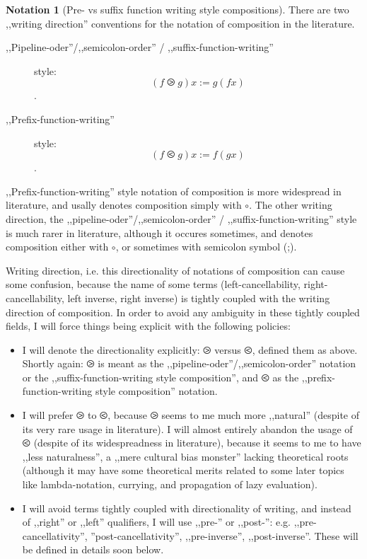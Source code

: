 \documentclass{article}
\newcommand{\parenth}[1]{\left(#1\right)}
\theoremstyle{definition}
\newtheorem{ntn}{Notation}
\begin{document}
	\begin{ntn}[Pre- vs suffix function writing style compositions]
	There are two ,,writing direction'' conventions for the notation of composition in the literature.
	\begin{description}
		\item[,,Pipeline-oder''/,,semicolon-order'' / ,,suffix-function-writing''] style:
		\[
			\parenth{f \ogreaterthan g}x := g\parenth{fx}
		\].
		\item[,,Prefix-function-writing''] style:
		\[
			\parenth{f \olessthan g}x := f\parenth{gx}
		\].
	\end{description}
	,,Prefix-function-writing'' style notation of composition is more widespread in literature, and usally denotes composition simply with $\circ$. The other writing direction, the ,,pipeline-oder''/,,semicolon-order'' / ,,suffix-function-writing'' style is much rarer in literature, although it occures sometimes, and denotes composition either with $\circ$, or sometimes with semicolon symbol (;).

	Writing direction, i.e. this directionality of notations of composition can cause some confusion, because the name of some terms (left-cancellability, right-cancellability, left inverse, right inverse) is tightly coupled with the writing direction of composition. In order to avoid any ambiguity in these tightly coupled fields, I will force things being explicit with the following policies:
		\begin{itemize}
			\item I will denote the directionality explicitly: $\ogreaterthan$ versus $\olessthan$, defined them as above. Shortly again: $\ogreaterthan$ is meant as the ,,pipeline-oder''/,,semicolon-order'' notation or the ,,suffix-function-writing style composition'', and $\olessthan$ as the ,,prefix-function-writing style composition'' notation.
			\item I will prefer $\ogreaterthan$ to $\olessthan$, because $\ogreaterthan$ seems to me much more ,,natural'' (despite of its very rare usage in literature). I will almost entirely abandon the usage of $\olessthan$ (despite of its widespreadness in literature), because it seems to me to have ,,less naturalness'', a ,,mere cultural bias monster'' lacking theoretical roots (although it may have some theoretical merits related to some later topics like lambda-notation, currying, and propagation of lazy evaluation).
			\item I will avoid terms tightly coupled with directionality of writing, and instead of ,,right'' or ,,left'' qualifiers, I will use ,,pre-'' or ,,post-'': e.g. ,,pre-cancellativity'', ''post-cancellativity'', ,,pre-inverse'', ,,post-inverse''. These will be defined in details soon below.
		\end{itemize}
	\end{ntn}
\end{document}
